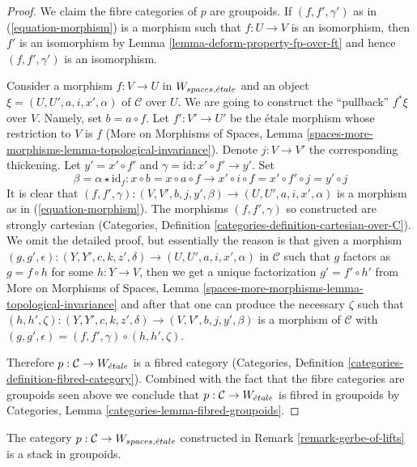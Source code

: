 \begin{proof}
We claim the fibre categories of $p$ are groupoids.
If $(f, f', \gamma')$ as in (\ref{equation-morphism})
is a morphism such that $f : U \to V$ is an isomorphism, then
$f'$ is an isomorphism by Lemma \ref{lemma-deform-property-fp-over-ft}
and hence $(f, f', \gamma')$ is an isomorphism.

\medskip\noindent
Consider a morphism $f : V \to U$ in $W_{spaces, {\acute{e}tale}}$
and an object $\xi = (U, U', a, i, x', \alpha)$
of $\mathcal{C}$ over $U$. We are going to construct the ``pullback''
$f^*\xi$ over $V$. 
Namely, set $b = a \circ f$. Let $f' : V' \to U'$ be the \'etale morphism
whose restriction to $V$ is $f$ (More on Morphisms of Spaces,
Lemma \ref{spaces-more-morphisms-lemma-topological-invariance}).
Denote $j : V \to V'$ the corresponding thickening.
Let $y' = x' \circ f'$ and $\gamma = \text{id} : x' \circ f' \to y'$.
Set
$$
\beta = \alpha \star \text{id}_f :
x \circ b = x \circ a \circ f \to
x' \circ i \circ f = x' \circ f' \circ j = y' \circ j
$$
It is clear that $(f, f', \gamma) : (V, V', b, j, y', \beta) \to
(U, U', a, i, x', \alpha)$ is a morphism as in
(\ref{equation-morphism}). The morphisms $(f, f', \gamma)$
so constructed are strongly cartesian
(Categories, Definition \ref{categories-definition-cartesian-over-C}).
We omit the detailed proof, but essentially the reason is that
given a morphism
$(g, g', \epsilon) : (Y, Y', c, k, z', \delta) \to (U, U', a, i, x', \alpha)$
in $\mathcal{C}$ such that $g$ factors as $g = f \circ h$ for some
$h : Y \to V$, then we get a unique factorization $g' = f' \circ h'$
from More on Morphisms of Spaces,
Lemma \ref{spaces-more-morphisms-lemma-topological-invariance}
and after that one can produce the necessary $\zeta$ such that
$(h, h', \zeta) :  (Y, Y', c, k, z', \delta) \to
(V, V', b, j, y', \beta)$ is a morphism of $\mathcal{C}$
with $(g, g', \epsilon) = (f, f', \gamma) \circ (h, h', \zeta)$.

\medskip\noindent
Therefore $p : \mathcal{C} \to W_{\acute{e}tale}$ is a fibred
category (Categories, Definition \ref{categories-definition-fibred-category}).
Combined with the fact that the fibre categories are groupoids
seen above we conclude that $p : \mathcal{C} \to W_{\acute{e}tale}$
is fibred in groupoids by Categories, Lemma
\ref{categories-lemma-fibred-groupoids}.
\end{proof}

\begin{lemma}
\label{lemma-gerbe-of-lifts-stack}
The category $p : \mathcal{C} \to W_{spaces, {\acute{e}tale}}$ constructed
in Remark \ref{remark-gerbe-of-lifts} is a stack in groupoids.
\end{lemma}


